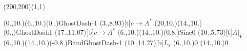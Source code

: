\unitlength=1bp%

\begin{feynartspicture}(200,200)(1,1)

\FADiagram{}
\FAProp(0.,10.)(6.,10.)(0.,){GhostDash}{-1}
\FALabel(3.,8.93)[t]{$c\to A^*$}
\FAProp(20,10.)(14.,10.)(0.,){GhostDash}{1}
\FALabel(17.,11.07)[b]{$c\to A^*$}
\FAProp(6.,10.)(14.,10.)(0.8,){Sine}{0}
\FALabel(10.,5.73)[t]{$A|_V$}
\FAProp(6.,10.)(14.,10.)(-0.8,){BandGhostDash}{-1}
\FALabel(10.,14.27)[b]{$L_\varepsilon$}
\FAVert(6.,10.){0}
\FAVert(14.,10.){0}
\end{feynartspicture}

